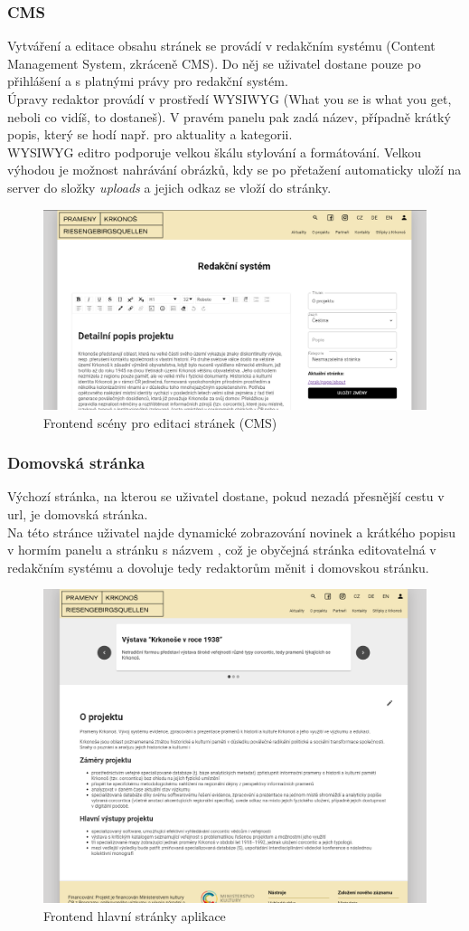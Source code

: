 \subsubsection{CMS}
Vytváření a editace obsahu stránek se provádí v redakčním systému (Content Management System, zkráceně CMS).
Do něj se uživatel dostane pouze po přihlášení a s platnými právy pro redakční systém.\\
Úpravy redaktor provádí v prostředí WYSIWYG (What you se is what you get, neboli co vidíš, to dostaneš).
V pravém panelu pak zadá název, případně krátký popis, který se hodí např. pro aktuality a kategorii.\\
WYSIWYG editro podporuje velkou škálu stylování a formátování. Velkou výhodou je možnost nahrávání obrázků,
kdy se po přetažení automaticky uloží na server do složky \textit{uploads} a jejich odkaz se vloží do stránky.
\begin{figure}[H]
	\centering
	\includegraphics[width=.8\linewidth]{img/cmsScene.png}
	\caption{Frontend scény pro editaci stránek (CMS)}
\end{figure}

\subsubsection{Domovská stránka}
Výchozí stránka, na kterou se uživatel dostane, pokud nezadá přesnější cestu v url, je domovská stránka.\\
Na této stránce uživatel najde dynamické zobrazování novinek a krátkého popisu v hormím panelu a stránku
s názvem , což je obyčejná stránka editovatelná v redakčním systému a dovoluje tedy
redaktorům měnit i domovskou stránku.
\begin{figure}[H]
	\centering
	\includegraphics[width=.8\linewidth]{img/homeScene.png}
	\caption{Frontend hlavní stránky aplikace}
\end{figure}

